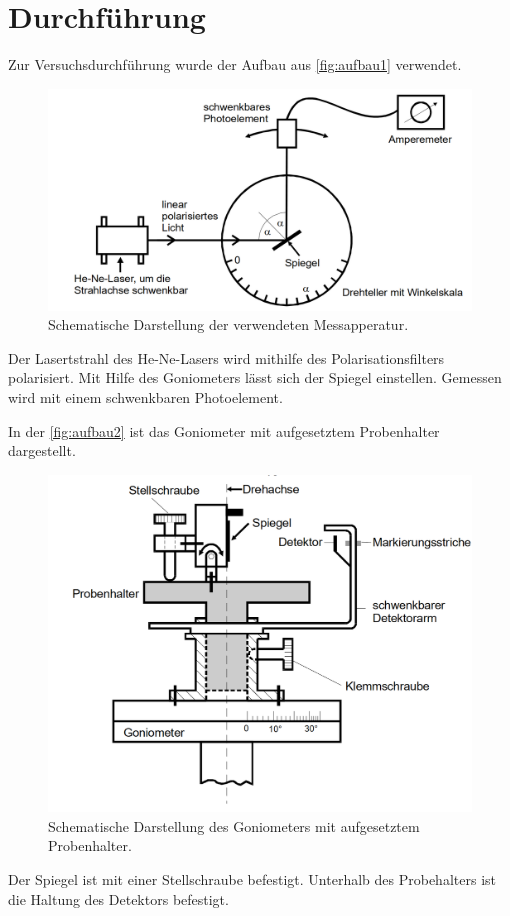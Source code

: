 \section{Durchführung}
\label{sec:durchführung}

Zur Versuchsdurchführung wurde der Aufbau aus \autoref{fig:aufbau1} verwendet.
\begin{figure}[H]
	\centering
	\includegraphics[width=0.6\linewidth]{content/grafik/aufbau1.png}
	\caption{Schematische Darstellung der verwendeten Messapperatur. \cite{fresnel}}
	\label{fig:aufbau1}
\end{figure}
Der Lasertstrahl des He-Ne-Lasers wird mithilfe des Polarisationsfilters polarisiert. Mit Hilfe des Goniometers lässt sich 
der Spiegel einstellen. Gemessen wird mit einem schwenkbaren Photoelement.

In der \autoref{fig:aufbau2} ist das Goniometer mit aufgesetztem Probenhalter dargestellt.
\begin{figure}[H]
	\centering
	\includegraphics[width=0.6\linewidth]{content/grafik/aufbau2.png}
	\caption{Schematische Darstellung des Goniometers mit aufgesetztem Probenhalter. \cite{fresnel}}
	\label{fig:aufbau2}
\end{figure}
Der Spiegel ist mit einer Stellschraube befestigt. Unterhalb des Probehalters ist die Haltung des Detektors befestigt.

